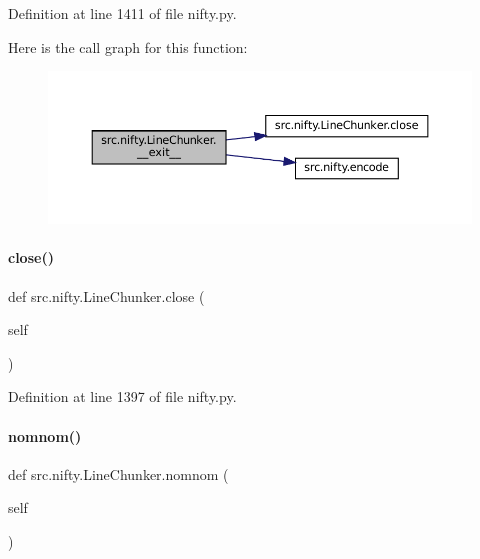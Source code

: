 Definition at line 1411 of file nifty.\+py.

Here is the call graph for this function\+:
\nopagebreak
\begin{figure}[H]
\begin{center}
\leavevmode
\includegraphics[width=350pt]{classsrc_1_1nifty_1_1LineChunker_afb2404f043fe01c296966415c29af251_cgraph}
\end{center}
\end{figure}
\mbox{\label{classsrc_1_1nifty_1_1LineChunker_a1b6f395ea4d5a099b7d99ba9dd1cc63d}} 
\paragraph{\texorpdfstring{close()}{close()}}
{\footnotesize\ttfamily def src.\+nifty.\+Line\+Chunker.\+close (\begin{DoxyParamCaption}\item[{}]{self }\end{DoxyParamCaption})}



Definition at line 1397 of file nifty.\+py.

\mbox{\label{classsrc_1_1nifty_1_1LineChunker_a01c0b5c62f685e52b3d18bf3638df155}} 
\paragraph{\texorpdfstring{nomnom()}{nomnom()}}
{\footnotesize\ttfamily def src.\+nifty.\+Line\+Chunker.\+nomnom (\begin{DoxyParamCaption}\item[{}]{self }\end{DoxyParamCaption})}




